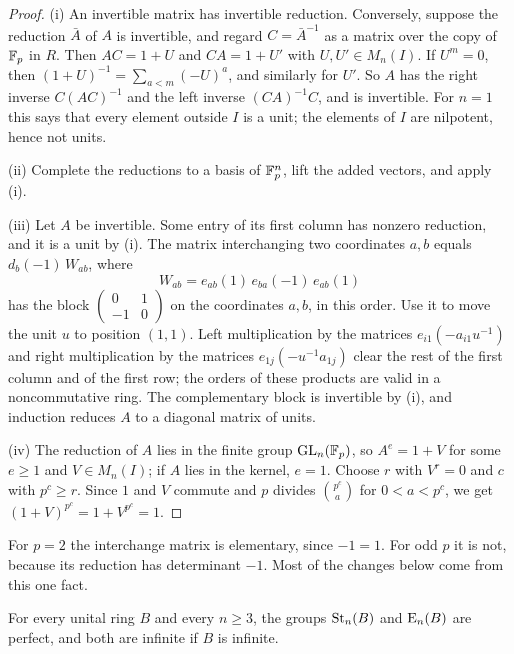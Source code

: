 \begin{proof}
(i) An invertible matrix has invertible reduction. Conversely, suppose the reduction $\bar A$ of $A$ is invertible, and
regard $C=\bar A^{-1}$ as a matrix over the copy of $\mathbb F_p$ in $R$. Then $AC=1+U$ and $CA=1+U'$ with $U,U'\in M_n(I)$.
If $U^m=0$, then $(1+U)^{-1}=\sum_{a<m}(-U)^a$, and similarly for $U'$. So $A$ has the right inverse $C(AC)^{-1}$ and
the left inverse $(CA)^{-1}C$, and is invertible. For $n=1$ this says that every element outside $I$ is a unit; the
elements of $I$ are nilpotent, hence not units.

(ii) Complete the reductions to a basis of $\mathbb F_p^n$, lift the added vectors, and apply (i).

(iii) Let $A$ be invertible. Some entry of its first column has nonzero reduction, and it is a unit by (i). The
matrix interchanging two coordinates $a,b$ equals $d_b(-1)\,W_{ab}$, where
\begin{equation}\label{eq:fp-W}
 W_{ab}=e_{ab}(1)\,e_{ba}(-1)\,e_{ab}(1)
\end{equation}
has the block $\left(\begin{smallmatrix}0&1\\-1&0\end{smallmatrix}\right)$ on the coordinates $a,b$, in this order.
Use it to move the unit $u$ to position $(1,1)$. Left multiplication by the matrices $e_{i1}(-a_{i1}u^{-1})$ and right
multiplication by the matrices $e_{1j}(-u^{-1}a_{1j})$ clear the rest of the first column and of the first row; the
orders of these products are valid in a noncommutative ring. The complementary block is invertible by (i), and
induction reduces $A$ to a diagonal matrix of units.

(iv) The reduction of $A$ lies in the finite group $\operatorname{GL}_n(\mathbb F_p)$, so $A^e=1+V$ for some $e\geq1$ and $V\in M_n(I)$; if
$A$ lies in the kernel, $e=1$. Choose $r$ with $V^r=0$ and $c$ with $p^c\geq r$. Since $1$ and $V$ commute and $p$
divides $\binom{p^c}{a}$ for $0<a<p^c$, we get $(1+V)^{p^c}=1+V^{p^c}=1$.
\end{proof}

For $p=2$ the interchange matrix is elementary, since $-1=1$. For odd $p$ it is not, because its reduction has
determinant $-1$. Most of the changes below come from this one fact.

\begin{lemma}\label{lem:fp-perfect}
For every unital ring $B$ and every $n\geq3$, the groups $\operatorname{St}_n(B)$ and $\operatorname{E}_n(B)$ are perfect, and both are infinite if
$B$ is infinite.
\end{lemma}

